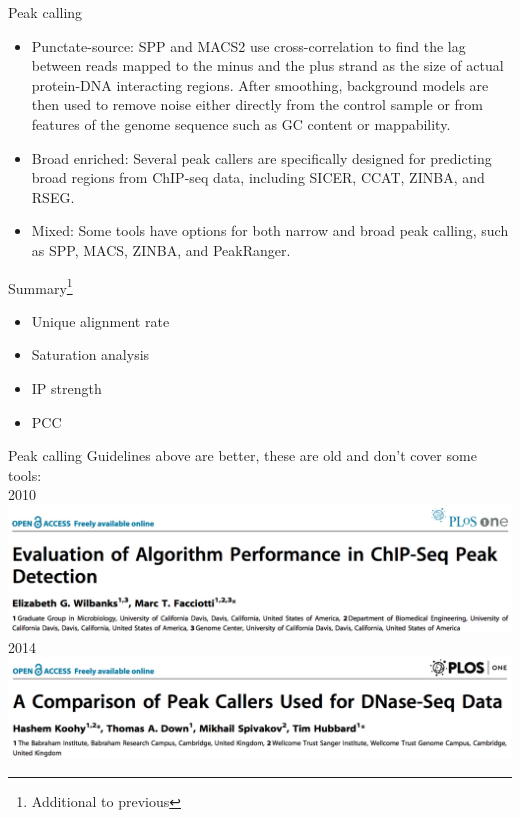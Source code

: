 \documentclass{beamer}
\begin{document}
\begin{frame}{Peak calling}
\begin{itemize}
\item Punctate-source: SPP and MACS2 use cross-correlation to find the lag between reads mapped to the minus and the plus strand as the size of actual protein-DNA interacting regions. After smoothing, background models are then used to remove noise either directly from the control sample or from features of the genome sequence such as GC content or mappability.
\item Broad enriched: Several peak callers are specifically designed for predicting broad regions from ChIP-seq data, including SICER, CCAT, ZINBA, and RSEG.
\item Mixed: Some tools have options for both narrow and broad peak calling, such as SPP, MACS, ZINBA, and PeakRanger. 
\end{itemize}
\end{frame}

\begin{frame}{Summary\footnote{Additional to previous}}
\begin{itemize}
\item Unique alignment rate
\item Saturation analysis
\item IP strength
\item PCC
\end{itemize}
\end{frame}


\begin{frame}{Peak calling}
Guidelines above are better, these are old and don't cover some tools:\\
2010\\
\includegraphics[width=\linewidth]{peakcalling1.png}\\
2014\\
\includegraphics[width=\linewidth]{peakcalling2.png}
\end{frame}
\end{document}
